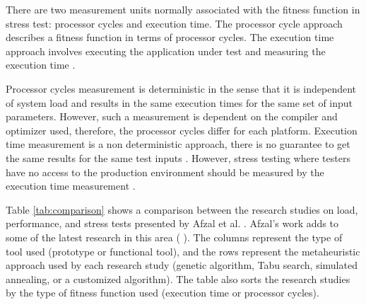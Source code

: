 There are two measurement units normally associated with the fitness function in stress test: processor cycles and execution time. The processor cycle approach describes a fitness function in terms of processor cycles. The execution time approach involves executing the application under test and measuring the execution time \cite{Afzal2009a} \cite{tracey2000search}.

Processor cycles measurement is deterministic in the sense that it is independent of system load and results in the same execution times for the same set of input parameters. However, such a measurement is dependent on the compiler and optimizer used, therefore, the processor cycles differ for each platform. Execution time measurement is a non deterministic approach, there is no guarantee to get the same results for the same test inputs \cite{Afzal2009a}.  However, stress testing where testers have no access to the production environment should be measured by the execution time measurement \cite{Molyneaux2009} \cite{Afzal2009a}.

Table \ref{tab:comparison}  shows a comparison between the research studies on load, performance, and stress tests presented by Afzal et al. \cite{Afzal2009a}. Afzal's work adds to some of the latest research in this area (\cite{Garousi2006} \cite{Garousi2010} \cite{DiAlesio2013} \cite{DiAlesio2014} \cite{Alesio2015} \cite{Gois2016} ). The columns represent the type of tool used (prototype or functional tool), and the rows represent the metaheuristic approach used by each research study (genetic algorithm, Tabu search, simulated annealing, or a customized algorithm). The table also sorts the research studies by the type of fitness function used (execution time or processor cycles). 


